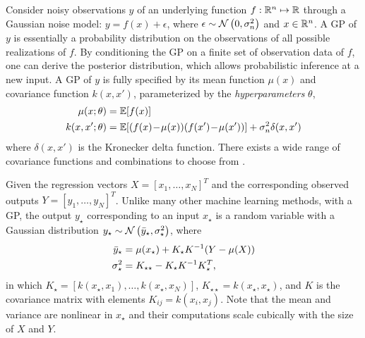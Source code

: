 Consider noisy observations \(y\) of an underlying function \(f: \mathbb{R}^n \mapsto \mathbb{R}\) through a Gaussian noise model: \(y = f(x) + \epsilon\), where \(\epsilon \sim \operatorname*{\mathcal{N}}\left(0, \sigma_n^2\right)\) and  \(x \in \mathbb{R}^n\).
A GP of $y$ is essentially a probability distribution on the observations of all possible realizations of $f$.
By conditioning the GP on a finite set of observation data of $f$, one can derive the posterior distribution, which allows probabilistic inference at a new input.
%
A GP of \(y\) is fully specified by its mean function \(\mu(x)\) and covariance function \(k(x,x')\), parameterized by the \emph{hyperparameters} \(\theta\),
\begin{align*}
\mu(x; \theta) &= \mathbb{E} [f(x)] \\
k(x,x'; \theta) &= \mathbb{E} [(f(x)\!-\!\mu(x)) (f(x') \!-\! \mu(x'))] + \sigma_n^2 \delta(x,x') \nonumber
\end{align*}
where \(\delta(x,x')\) is the Kronecker delta function.
There exists a wide range of covariance functions and combinations to choose from \cite{Rasmussen2006}.

Given the regression vectors \(X = [x_1, \dots, x_N]^T\) and the corresponding observed outputs \(Y = [y_1, \dots, y_N]^T\).
Unlike many other machine learning methods, with a GP, the output \(y_\star\) corresponding to an input \(x_\star\) is a random variable with a Gaussian distribution \(y_{\star} \sim \operatorname*{\mathcal{N}}\left(\bar{y}_\star, \sigma_\star^2\right)\), where
\begin{subequations}
\label{E:gp-regression}
\begin{align*}
\bar{y}_\star &= \mu(x_\star) + K_\star K^{-1} (Y - \mu(X))\\
\sigma_\star^2 &= K_{\star \star} - K_\star K^{-1} K_\star^T \text,
\end{align*}
\end{subequations}
in which \(K_\star = [k(x_\star, x_1), \dots, k(x_\star, x_N)]\), \(K_{\star \star} = k(x_\star, x_\star)\), and $K$ is the covariance matrix with elements \(K_{ij} = k(x_i, x_j)\).
Note that the mean and variance are nonlinear in $x_{\star}$ and their computations scale cubically with the size of $X$ and $Y$.


